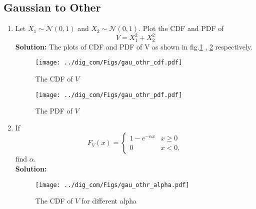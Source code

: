 \documentclass{article}
\numberwithin{equation}{subsection}
\numberwithin{figure}{subsection}
\providecommand{\gauss}[2]{\mathcal{N}\ensuremath{\left(#1,#2\right)}}
\newcommand{\solution}{\noindent \textbf{Solution: }}
\renewcommand\thesection{\arabic{section}}
\renewcommand\thesubsection{\thesection.\arabic{subsection}}
\begin{document}
\subsection{Gaussian to Other}
\begin{enumerate}[label=\thesubsection.\arabic*,ref=\thesubsection.\arabic{figure}]
\item
Let $X_1 \sim  \gauss{0}{1}$ and $X_2 \sim  \gauss{0}{1}$. Plot the CDF and PDF of
%
\begin{equation}
V = X_1^2 + X_2^2
\end{equation}
\solution 
The plots of CDF and PDF of V as shown in fig.\ref{fig:gauss_cdf1} , \ref{fig:gauss_pdf1} respectively.
\begin{center}
\end{center}
\begin{center}
\end{center}
\begin{figure}
\centering
\texttt{[image: ../dig\_com/Figs/gau\_othr\_cdf.pdf]}  
\caption{The CDF of $V$}
\label{fig:gauss_cdf1}
\end{figure}
\begin{figure}
\centering
\texttt{[image: ../dig\_com/Figs/gau\_othr\_pdf.pdf]}   
\caption{The PDF of $V$}
\label{fig:gauss_pdf1}
\end{figure}
\item
If
%
\begin{equation}
F_{V}(x) = 
\begin{cases}
1 - e^{-\alpha x} & x \geq 0 \\
0 & x < 0,
\end{cases}
\end{equation}
%
find $\alpha$.\\
\solution
\begin{center}
\end{center}
\begin{figure}
\centering
\texttt{[image: ../dig\_com/Figs/gau\_othr\_alpha.pdf]}    
\caption{The CDF of $V$ for different alpha}
\label{fig:gauss_cdf_alpha}
\end{figure}

\end{enumerate}
\end{document}

